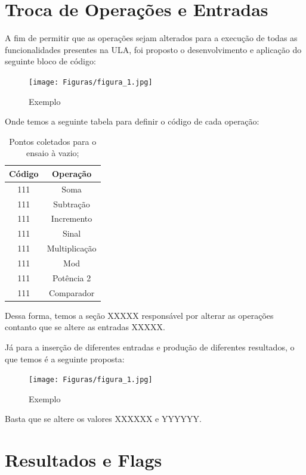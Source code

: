 \documentclass[a4paper, 12pt]{article}
\begin{document}
\section{Troca de Operações e Entradas}
A fim de permitir que as operações sejam alterados para a execução de todas as funcionalidades presentes na ULA, foi proposto o desenvolvimento e aplicação do seguinte bloco de código:

\begin{figure}[H]
\caption{Exemplo}

\centering
\texttt{[image: Figuras/figura\_1.jpg]}
\label{figura:qualquernome}
\end{figure}

Onde temos a seguinte tabela para definir o código de cada operação:

\begin{table}[htb]
\centering
\begin{tabular}{c|c}
Código & Operação \\ \hline
111	& Soma 		\\\hline
111 & Subtração	\\\hline
111 & Incremento \\\hline
111 & Sinal \\\hline
111 & Multiplicação \\\hline
111 & Mod \\\hline
111 & Potência 2 \\\hline
111 & Comparador
\end{tabular}
\caption{Pontos coletados para o ensaio à vazio;}
\label{vazio}
\end{table}

Dessa forma, temos a seção XXXXX responsável por alterar as operações contanto que se altere as entradas XXXXX.

Já para a inserção de diferentes entradas e produção de diferentes resultados, o que temos é a seguinte proposta:

\begin{figure}[H]
\caption{Exemplo}

\centering
\texttt{[image: Figuras/figura\_1.jpg]}
\label{figura:qualquernome}
\end{figure}

Basta que se altere os valores XXXXXX e YYYYYY.

\section{Resultados e Flags}
\end{document}
